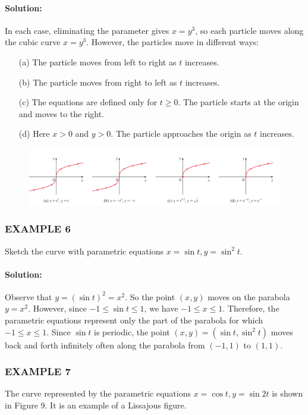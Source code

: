 \documentclass{article}
\begin{document}
\paragraph{Solution:} In each case, eliminating the parameter gives $x=y^3$, so each particle moves along the cubic curve $x=y^3$. However, the particles move in different ways:
\begin{enumerate}
    \item[(a)] The particle moves from left to right as $t$ increases.
    \item[(b)] The particle moves from right to left as $t$ increases.
    \item[(c)] The equations are defined only for $t \ge 0$. The particle starts at the origin and moves to the right.
    \item[(d)] Here $x>0$ and $y>0$. The particle approaches the origin as $t$ increases.
\end{enumerate}

\begin{figure}[htbp]
    \centering
    \includegraphics[width=1\textwidth]{graph22.png} %
\end{figure}

\subsubsection*{EXAMPLE 6}
Sketch the curve with parametric equations $x=\sin t, y=\sin^2 t$.

\paragraph{Solution:} Observe that $y = (\sin t)^2 = x^2$. So the point $(x,y)$ moves on the parabola $y=x^2$. However, since $-1 \le \sin t \le 1$, we have $-1 \le x \le 1$. Therefore, the parametric equations represent only the part of the parabola for which $-1 \le x \le 1$. Since $\sin t$ is periodic, the point $(x,y)=(\sin t, \sin^2 t)$ moves back and forth infinitely often along the parabola from $(-1,1)$ to $(1,1)$.

\subsubsection*{EXAMPLE 7}
The curve represented by the parametric equations $x=\cos t, y=\sin 2t$ is shown in Figure 9. It is an example of a Lissajous figure.
\end{document}

